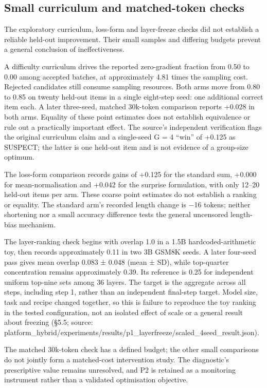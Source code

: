 \documentclass[12pt,a4paper]{report}
\begin{document}
\subsection{Small curriculum and matched-token
checks}\label{small-curriculum-and-matched-token-checks}

The exploratory curriculum, loss-form and layer-freeze checks did not
establish a reliable held-out improvement. Their small samples and
differing budgets prevent a general conclusion of ineffectiveness.

A difficulty curriculum drives the reported zero-gradient fraction from
0.50 to 0.00 among accepted batches, at approximately 4.81 times the
sampling cost. Rejected candidates still consume sampling resources.
Both arms move from 0.80 to 0.85 on twenty held-out items in a single
eight-step seed: one additional correct item each. A later three-seed,
matched 30k-token comparison reports +0.028 in both arms. Equality of
these point estimates does not establish equivalence or rule out a
practically important effect. The source's independent verification
flags the original curriculum claim and a single-seed G = 4 ``win'' of
+0.125 as SUSPECT; the latter is one held-out item and is not evidence
of a group-size optimum.

The loss-form comparison records gains of +0.125 for the standard sum,
+0.000 for mean-normalisation and +0.042 for the surprise formulation,
with only 12--20 held-out items per arm. These coarse point estimates do
not establish a ranking or equality. The standard arm's recorded length
change is −16 tokens; neither shortening nor a small accuracy difference
tests the general uncensored length-bias mechanism.

The layer-ranking check begins with overlap 1.0 in a 1.5B
hardcoded-arithmetic toy, then records approximately 0.11 in two 3B
GSM8K seeds. A later four-seed pass gives mean overlap 0.083 ± 0.048
(mean ± SD), while top-quarter concentration remains approximately 0.39.
Its reference is 0.25 for independent uniform top-nine sets among 36
layers. The target is the aggregate across all steps, including step 1,
rather than an independent final-step target. Model size, task and
recipe changed together, so this is failure to reproduce the toy ranking
in the tested configuration, not an isolated effect of scale or a
general result about freezing (§5.5; source:
platform\_hybrid/experiments/results/p1\_layerfreeze/scaled\_\allowbreak{}4seed\_\allowbreak{}result.json).

The matched 30k-token check has a defined budget; the other small
comparisons do not jointly form a matched-cost intervention study. The
diagnostic's prescriptive value remains unresolved, and P2 is retained
as a monitoring instrument rather than a validated optimisation
objective.
\end{document}
